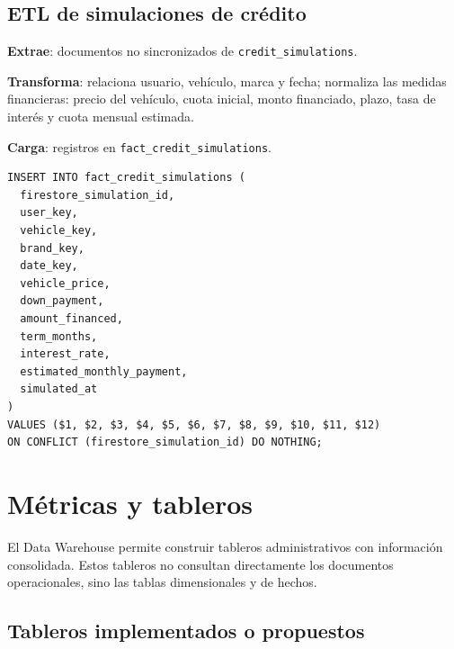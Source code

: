 \documentclass[12pt,letterpaper]{article}
\begin{document}
\subsection{ETL de simulaciones de crédito}

\textbf{Extrae}: documentos no sincronizados de \texttt{credit\_simulations}.

\textbf{Transforma}: relaciona usuario, vehículo, marca y fecha; normaliza las medidas financieras: precio del vehículo, cuota inicial, monto financiado, plazo, tasa de interés y cuota mensual estimada.

\textbf{Carga}: registros en \texttt{fact\_credit\_simulations}.

\begin{lstlisting}[style=sqlstyle,caption={Carga de simulaciones de crédito}]
INSERT INTO fact_credit_simulations (
  firestore_simulation_id,
  user_key,
  vehicle_key,
  brand_key,
  date_key,
  vehicle_price,
  down_payment,
  amount_financed,
  term_months,
  interest_rate,
  estimated_monthly_payment,
  simulated_at
)
VALUES ($1, $2, $3, $4, $5, $6, $7, $8, $9, $10, $11, $12)
ON CONFLICT (firestore_simulation_id) DO NOTHING;
\end{lstlisting}

\section{Métricas y tableros}

El Data Warehouse permite construir tableros administrativos con información consolidada. Estos tableros no consultan directamente los documentos operacionales, sino las tablas dimensionales y de hechos.

\subsection{Tableros implementados o propuestos}
\end{document}
